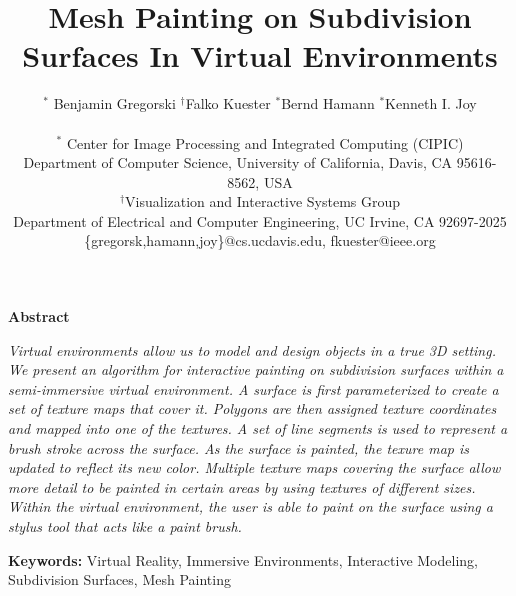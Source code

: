 \documentclass[10pt,twocolumn]{article}
\begin{document}
\title {Mesh Painting on Subdivision Surfaces In Virtual Environments}
\author{
  $^{*}$ Benjamin Gregorski \hspace{0.5cm} $^{\dag}$Falko Kuester 
    \hspace{0.5cm} $^{*}$Bernd Hamann \hspace{0.5cm} $^{*}$Kenneth I. Joy\\
  \\
  $^{*}$ Center for Image Processing and Integrated Computing (CIPIC)\\
  Department of Computer Science,
  University of California,
  Davis, CA 95616-8562, USA\\
  $^{\dag}$Visualization and Interactive Systems Group\\
  Department of Electrical and Computer Engineering, UC Irvine, CA 92697-2025\\
  \{gregorsk,hamann,joy\}@cs.ucdavis.edu, fkuester@ieee.org \\ 
}


\date{}
\maketitle

\begin{center}{\Large\bf Abstract}\end{center}
{\em
\indent 
Virtual environments allow us to model and design objects in a true 3D setting.
We present an algorithm for interactive painting on subdivision surfaces 
within a semi-immersive virtual environment. 
A surface is first parameterized to create a set of texture maps that cover it. 
Polygons are then assigned texture coordinates and mapped into one of the textures.
A set of line segments is used to represent a brush stroke across the surface.
As the surface is painted, the texure map is updated to reflect its new color. 
Multiple texture maps covering the surface allow
more detail to be painted in certain areas by using textures of different sizes.
Within the virtual environment, the user is able to paint on the surface
using a stylus tool that acts like a paint brush.
}

{\bf Keywords: }Virtual Reality, Immersive Environments,
Interactive Modeling, Subdivision Surfaces, Mesh Painting

\makeatletter
\renewcommand{\@seccntformat}[1]{{\csname the#1\endcsname}.\hspace{0.5em}}
\makeatother
\end{document}
